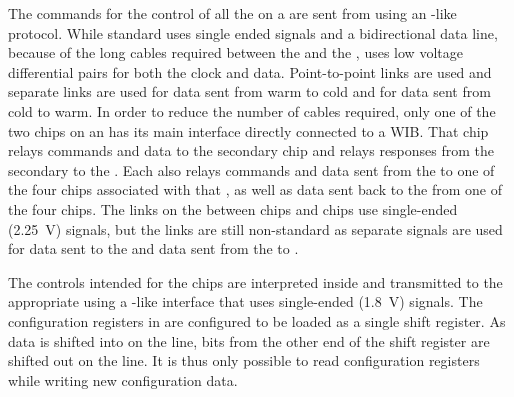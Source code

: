 The commands for the control of all the  on a  are sent 
from  using an -like~\cite{i2c} protocol. While standard 
 uses single ended  signals and a bidirectional data 
line, because of the long cables required between the  and the 
,  uses low voltage differential pairs for both 
the  clock and data. Point-to-point links are used and separate 
links are used for data sent from warm to cold and for data sent from cold to 
warm. In order to reduce the number of cables required, only one of the two 
 chips on an  has its main  interface 
directly connected to a WIB. That  chip relays  
commands and data to the secondary  chip and relays  
responses from the secondary  to the . Each 
 also relays  commands and data sent from the 
 to one of the four  chips associated with that 
, as well as data sent back to the  from one of the 
four  chips. The links on the  between  
chips and  chips use single-ended (\SI{2.25}{V})  
signals, but the  links are still non-standard as separate signals 
are used for data sent to the  and data sent from the 
 to .

The controls intended for the   chips are interpreted 
inside  and transmitted to the appropriate  using 
a -like interface that uses single-ended (\SI{1.8}{V})  
signals. The configuration registers in  are configured to be 
loaded as a single shift register. As data is shifted into  on 
the  line, bits from the other end of the shift register are shifted 
out on the  line. It is thus only possible to read  
configuration registers while writing new configuration data.

